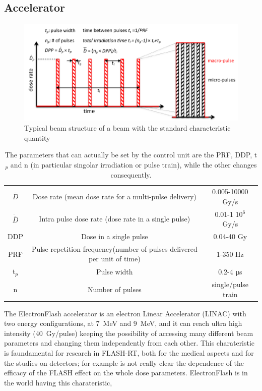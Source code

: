    \subsection{Accelerator}
      \begin{figure}
         \centering
         \includegraphics[width=.9\linewidth]{figures/test_beam/beam_structure.pdf}
         \caption{Typical beam structure of a beam with the standard characteristic quantity}
         \label{fig:beam_structure}
      \end{figure}
      \begin{table}
         \begin{center}
         \begin{tabular}{| c | c | c |}
         \hline
      $\bar{D}$ & Dose rate (mean dose rate for a multi-pulse delivery) & 0.005-10000 Gy/s\\
      $\Dot{\bar{D}}$ & Intra pulse dose rate (dose rate in a single pulse) &  0.01-1 10$^6$ Gy/s  \\
      DDP & Dose in a single pulse & 0.04-40 Gy\\
      PRF & Pulse repetition frequency(number of pulses delivered per unit of time) & 1-350 Hz\\
      t$_{p}$ & Pulse width & 0.2-4 \si{\us}\\
      n & Number of pulses & single/pulse train \\
      \hline
         \end{tabular}
         \caption{The parameters that can actually be set by the control unit are the PRF, DDP, t$_p$ and n (in particular singolar irradiation or pulse train), while the other changes consequently.}
         \label{tab:beam_parameters}
         \end{center}
      \end{table}  
      The ElectronFlash accelerator is an electron Linear Accelerator (LINAC) with two energy configurations, at \SI{7}{MeV} and \SI{9}{MeV}, and it can reach ultra high intensity (\SI{40}{Gy/pulse}) keeping the possibility of accessing many different beam parameters and changing them independently from each other. This charateristic is faundamental for research in FLASH-RT, both for the medical aspects and for the studies on detectors; for example is not really clear the dependence of the efficacy of the FLASH effect on the whole dose parameters. ElectronFlash is  in the world having this charateristic,     
